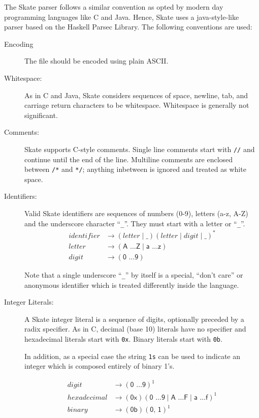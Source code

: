\documentclass[a4paper,11pt,twoside]{report}
\begin{document}
{{The Skate parser follows a similar convention as opted by modern day 
programming languages like C and Java. Hence, Skate uses a java-style-like
parser based on the Haskell Parsec Library. The following conventions are used:

\begin{description}
\item[Encoding] The file should be encoded using plain ASCII.
\item[Whitespace:]  As in C and Java, Skate considers sequences of
  space, newline, tab, and carriage return characters to be
  whitespace.  Whitespace is generally not significant. 

\item[Comments:] Skate supports C-style comments.  Single line comments
  start with \texttt{//} and continue until the end of the line.
  Multiline comments are enclosed between \texttt{/*} and \texttt{*/};
  anything inbetween is ignored and treated as white space.

\item[Identifiers:] Valid Skate identifiers are sequences of numbers
  (0-9), letters (a-z, A-Z) and the underscore character ``\texttt{\_}''.  They
  must start with a letter or ``\texttt{\_}''.  
  \begin{align*}
    identifier & \rightarrow ( letter \mid \_ ) (letter \mid digit \mid \_)^{\textrm{*}} \\
    letter & \rightarrow (\textsf{A \ldots Z} \mid  \textsf{a \ldots z})\\
    digit & \rightarrow (\textsf{0 \ldots 9})
\end{align*}

  Note that a single underscore ``\texttt{\_}'' by itself is a special,
  ``don't care'' or anonymous identifier which is treated differently
  inside the language. 
  
\item[Integer Literals:] A Skate integer literal is a sequence of
  digits, optionally preceded by a radix specifier.  As in C, decimal (base 10)
  literals have no specifier and hexadecimal literals start with
  \texttt{0x}.  Binary literals start with \texttt{0b}. 

  In addition, as a special case the string \texttt{1s} can be used to
  indicate an integer which is composed entirely of binary 1's. 

\begin{align*}
digit & \rightarrow (\textsf{0 \ldots 9})^{\textrm{1}}\\
hexadecimal & \rightarrow (\textsf{0x})(\textsf{0 \ldots 9} \mid \textsf{A \ldots F} \mid \textsf{a \ldots f})^{\textrm{1}}\\
binary & \rightarrow (\textsf{0b})(\textsf{0, 1})^{\textrm{1}}\\
\end{align*}


\end{description}}}
\end{document}
